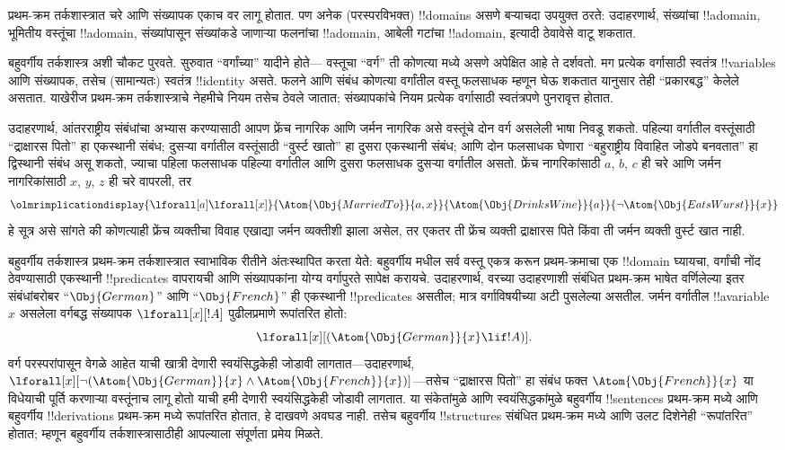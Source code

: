\documentclass[../../../include/open-logic-section]{subfiles}
\begin{document}


प्रथम-क्रम तर्कशास्त्रात चरे आणि संख्यापक एकाच वर लागू होतात.
पण अनेक (परस्परविभक्त) !!{domain}s असणे बऱ्याचदा उपयुक्त ठरते: उदाहरणार्थ,
संख्यांचा !!a{domain}, भूमितीय वस्तूंचा !!a{domain}, संख्यांपासून संख्यांकडे
जाणाऱ्या फलनांचा !!a{domain}, आबेली गटांचा !!a{domain}, इत्यादी ठेवावेसे वाटू
शकतात.

बहुवर्गीय तर्कशास्त्र अशी चौकट पुरवते. सुरुवात ``वर्गांच्या'' यादीने होते---
वस्तूचा ``वर्ग'' ती कोणत्या मध्ये असणे अपेक्षित आहे ते दर्शवतो.
मग प्रत्येक वर्गासाठी स्वतंत्र !!{variable}s आणि संख्यापक, तसेच (सामान्यतः)
स्वतंत्र !!{identity} असते. फलने आणि संबंध कोणत्या वर्गांतील वस्तू फलसाधक
म्हणून घेऊ शकतात यानुसार तेही ``प्रकारबद्ध'' केलेले असतात. याखेरीज
प्रथम-क्रम तर्कशास्त्राचे नेहमीचे नियम तसेच ठेवले जातात; संख्यापकांचे नियम
प्रत्येक वर्गासाठी स्वतंत्रपणे पुनरावृत्त होतात.

उदाहरणार्थ, आंतरराष्ट्रीय संबंधांचा अभ्यास करण्यासाठी आपण फ्रेंच नागरिक आणि
जर्मन नागरिक असे वस्तूंचे दोन वर्ग असलेली भाषा निवडू शकतो. पहिल्या वर्गातील
वस्तूंसाठी ``द्राक्षारस पितो'' हा एकस्थानी संबंध; दुसऱ्या वर्गातील वस्तूंसाठी
``वुर्स्ट खातो'' हा दुसरा एकस्थानी संबंध; आणि दोन फलसाधक घेणारा ``बहुराष्ट्रीय
विवाहित जोडपे बनवतात'' हा द्विस्थानी संबंध असू शकतो, ज्याचा पहिला फलसाधक
पहिल्या वर्गातील आणि दुसरा फलसाधक दुसऱ्या वर्गातील असतो. फ्रेंच नागरिकांसाठी
$a$, $b$, $c$ ही चरे आणि जर्मन नागरिकांसाठी $x$, $y$, $z$ ही चरे वापरली, तर
\[
\olmrimplicationdisplay{\lforall[a]\lforall[x]}{\Atom{\Obj{MarriedTo}}{a,x}}
{\Atom{\Obj{DrinksWine}}{a}}{\lnot \Atom{\Obj{EatsWurst}}{x}}
\]
हे सूत्र असे सांगते की कोणत्याही फ्रेंच व्यक्तीचा विवाह एखाद्या जर्मन
व्यक्तीशी झाला असेल, तर एकतर ती फ्रेंच व्यक्ती द्राक्षारस पिते किंवा ती जर्मन
व्यक्ती वुर्स्ट खात नाही.

बहुवर्गीय तर्कशास्त्र प्रथम-क्रम तर्कशास्त्रात स्वाभाविक रीतीने अंतःस्थापित
करता येते: बहुवर्गीय मधील सर्व वस्तू एकत्र करून प्रथम-क्रमाचा एक
!!{domain} घ्यायचा, वर्गांची नोंद ठेवण्यासाठी एकस्थानी !!{predicate}s
वापरायची आणि संख्यापकांना योग्य वर्गापुरते सापेक्ष करायचे. उदाहरणार्थ, वरच्या
उदाहरणाशी संबंधित प्रथम-क्रम भाषेत वर्णिलेल्या इतर संबंधांबरोबर
``$\Obj{German}$'' आणि ``$\Obj{French}$'' ही एकस्थानी !!{predicate}s असतील;
मात्र वर्गाविषयीच्या अटी पुसलेल्या असतील. जर्मन वर्गातील !!a{variable}~$x$
असलेला वर्गबद्ध संख्यापक $\lforall[x][!A]$ पुढीलप्रमाणे रूपांतरित होतो:
\[
\lforall[x][(\Atom{\Obj{German}}{x} \lif !A)].
\]
वर्ग परस्परांपासून वेगळे आहेत याची खात्री देणारी स्वयंसिद्धकेही जोडावी
लागतात---उदाहरणार्थ,
$\lforall[x][\lnot (\Atom{\Obj{German}}{x} \land
  \Atom{\Obj{French}}{x})]$---तसेच ``द्राक्षारस पितो'' हा संबंध फक्त
$\Atom{\Obj{French}}{x}$ या विधेयाची पूर्ति करणाऱ्या वस्तूंनाच लागू होतो
याची हमी देणारी स्वयंसिद्धकेही जोडावी लागतात. या संकेतांमुळे आणि
स्वयंसिद्धकांमुळे बहुवर्गीय !!{sentence}s प्रथम-क्रम मध्ये आणि
बहुवर्गीय !!{derivation}s प्रथम-क्रम मध्ये रूपांतरित होतात,
हे दाखवणे अवघड नाही. तसेच बहुवर्गीय !!{structure}s संबंधित प्रथम-क्रम
मध्ये आणि उलट दिशेनेही ``रूपांतरित'' होतात; म्हणून बहुवर्गीय
तर्कशास्त्रासाठीही आपल्याला संपूर्णता प्रमेय मिळते.
\end{document}
